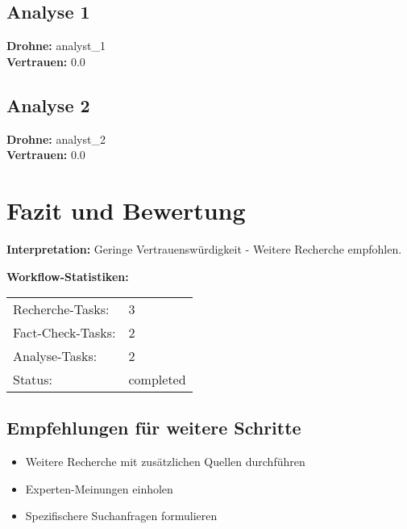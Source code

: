 \documentclass[12pt,a4paper]{article}
\begin{document}
\subsection{Analyse 1}

\textbf{Drohne:} analyst\_1\\
\textbf{Vertrauen:} 0.0%

\subsection{Analyse 2}

\textbf{Drohne:} analyst\_2\\
\textbf{Vertrauen:} 0.0%


\newpage
\section{Fazit und Bewertung}


\textbf{Interpretation:} Geringe Vertrauenswürdigkeit - Weitere Recherche empfohlen.

\textbf{Workflow-Statistiken:}
\begin{tabular}{ll}
Recherche-Tasks: & 3 \\
Fact-Check-Tasks: & 2 \\
Analyse-Tasks: & 2 \\
Status: & completed \\
\end{tabular}

\subsection{Empfehlungen für weitere Schritte}

\begin{itemize}
\item Weitere Recherche mit zusätzlichen Quellen durchführen
\item Experten-Meinungen einholen
\item Spezifischere Suchanfragen formulieren
\end{itemize}
\end{document}
